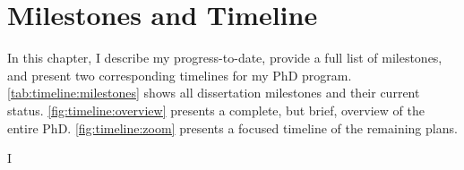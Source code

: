 
\chapter{Milestones and Timeline}
\label{ch:timeline}
In this chapter, I describe my progress-to-date, provide a full list of milestones, and present two corresponding timelines for my PhD program.
\autoref{tab:timeline:milestones} shows all dissertation milestones and their current status.
\autoref{fig:timeline:overview} presents a complete, but brief, overview of the entire PhD.
\autoref{fig:timeline:zoom} presents a focused timeline of the remaining plans.


\newcommand{\MilestoneComplete}{ \textcolor[rgb]{0,0.4,0} {Complete}}
\newcommand{\MilestonePublished}[1]{ \textcolor[rgb]{0,0.4,0} {Published: #1}}

\newcommand{\MilestoneScheduled}{ \textcolor[rgb]{0.5,0.6,0.5} {Scheduled}}
\newcommand{\MilestoneAccepted}{ \textcolor[rgb]{0.5,0.6,0.5} {Accepted}}

\newcommand{\MilestoneInReview}{ \textcolor[rgb]{0.6,0.6,0.3} {In Review}}
I
\newcommand{\MilestoneInProgress}{ \textcolor[rgb]{0,0,0.6} {In Progress}}

\newcommand{\MilestonePlanned}{ \textcolor[rgb]{0.7,0.7,0.7} {Planned}}

\newcommand{\MilestoneSideProject}{ \emph{Side Project:} }

